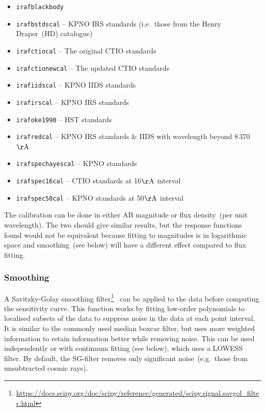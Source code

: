 \documentclass[linenumbers, twocolumn]{aastex631}
\begin{document}
\begin{itemize}
    \item \texttt{irafblackbody}
    \item \texttt{irafbstdscal} -- KPNO IRS standards (i.e.\ those from the Henry Draper~(HD) catalogue)
    \item \texttt{irafctiocal} -- The original CTIO standards \citet{1983MNRAS.204..347S, 1984MNRAS.206..241B}
    \item \texttt{irafctionewcal} -- The updated CTIO standards \citet{1992PASP..104..533H, 1994PASP..106..566H}
    \item \texttt{irafiidscal} -- KPNO IIDS standards \citet{1988ApJ...328..315M}
    \item \texttt{irafirscal} -- KPNO IRS standards \citet{1988ApJ...328..315M}
    \item \texttt{irafoke1990} -- HST standards \citet{1990AJ.....99.1621O}
    \item \texttt{irafredcal} -- KPNO IRS standards \& IIDS \citet{1988ApJ...328..315M} with wavelength beyond 8\,370\,$\mathrm{\AA}$
    \item \texttt{irafspechayescal} -- KPNO standards \citet{1988ApJ...328..315M}
    \item \texttt{irafspec16cal} -- CTIO standards \citet{1992PASP..104..533H, 1994PASP..106..566H} at 16$\mathrm{\AA}$ interval
    \item \texttt{irafspec50cal} -- KPNO standards \citet{1988ApJ...328..315M, 1990ApJ...358..344M} at 50$\mathrm{\AA}$ interval
\end{itemize}



The calibration can be done in either AB magnitude or
flux density~(per unit wavelength). The two should give similar
results, but the response functions found would not be equivalent
because fitting to magnitudes is in logarithmic space and smoothing~(see
below) will have a different effect compared to flux fitting.

\subsubsection*{Smoothing}
A Savitzky-Golay smoothing
filter\footnote{\url{https://docs.scipy.org/doc/scipy/reference/generated/scipy.signal.savgol_filter.html}}~\citep[hereafter, SG-filter]{1964AnaCh..36.1627S}
can be applied to the data before computing the sensitivity curve. This function
works by fitting low-order polynomials to localised subsets of the data to
suppress noise in the data at each point interval. It is similar to the
commonly used median boxcar filter, but uses more weighted information to
retain information better while removing noise. This can be used independently
or with continuum fitting (see below), which uses a LOWESS filter. By default,
the SG-filter removes only significant noise~(e.g.\ those from unsubtracted
cosmic rays).
\end{document}
